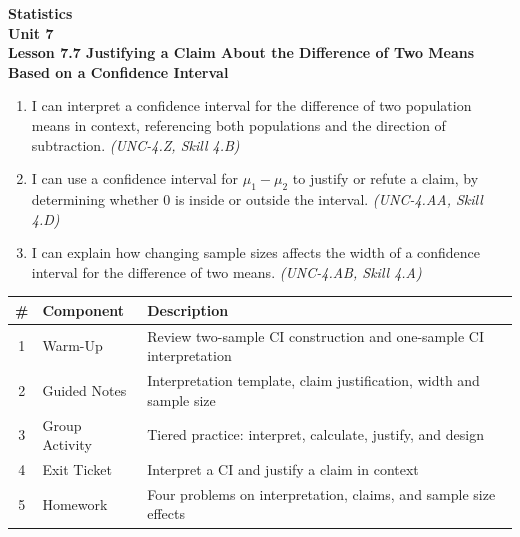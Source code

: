 \documentclass[10pt]{article}
\begin{document}
\vspace{-0.8in}

\begin{center}
  {\color{white}\textbf{\LARGE Statistics}}\\[4pt]
  {\color{skymid}\large\textbf{Unit 7}}\\[6pt]
  {\color{white}\textbf{\large Lesson 7.7 \quad Justifying a Claim About the Difference of Two Means Based on a Confidence Interval}}
\end{center}

\vspace{0.22in}
\namedateperiod
\vspace{0.18in}

\begin{learningtargetbox}
\small
\begin{enumerate}[leftmargin=1.5em, itemsep=5pt]
  \item I can interpret a confidence interval for the difference of two population means
        in context, referencing both populations and the direction of subtraction.
        \textit{(UNC-4.Z, Skill 4.B)}
  \item I can use a confidence interval for $\mu_1 - \mu_2$ to justify or refute a claim,
        by determining whether 0 is inside or outside the interval.
        \textit{(UNC-4.AA, Skill 4.D)}
  \item I can explain how changing sample sizes affects the width of a confidence interval
        for the difference of two means.
        \textit{(UNC-4.AB, Skill 4.A)}
\end{enumerate}
\end{learningtargetbox}

\vspace{0.14in}

\begin{tocbox}
\small
\renewcommand{\arraystretch}{1.5}
\begin{tabularx}{\linewidth}{@{} c l X @{}}
\rowcolor{sky}
\textbf{\#} & \textbf{Component} & \textbf{Description} \\
\midrule
1 & Warm-Up        & Review two-sample CI construction and one-sample CI interpretation \\
2 & Guided Notes   & Interpretation template, claim justification, width and sample size \\
3 & Group Activity & Tiered practice: interpret, calculate, justify, and design \\
4 & Exit Ticket    & Interpret a CI and justify a claim in context \\
5 & Homework       & Four problems on interpretation, claims, and sample size effects \\
\end{tabularx}
\end{tocbox}
\end{document}
